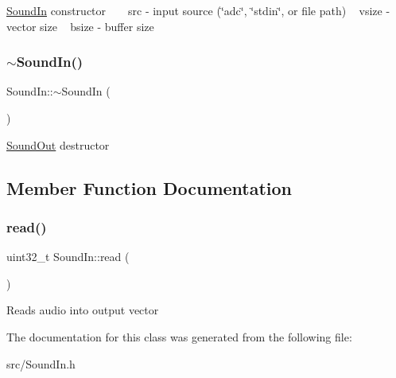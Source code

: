 \hyperlink{class_sound_in}{Sound\+In} constructor ~\newline
~\newline
src -\/ input source (\char`\"{}adc\char`\"{}, \char`\"{}stdin\char`\"{}, or file path) ~\newline
vsize -\/ vector size ~\newline
bsize -\/ buffer size ~\newline
\mbox{\label{class_sound_in_ac72a498714e161d1d691821f1214f2f3}} 
\subsubsection{\texorpdfstring{$\sim$\+Sound\+In()}{~SoundIn()}}
{\footnotesize\ttfamily Sound\+In\+::$\sim$\+Sound\+In (\begin{DoxyParamCaption}{ }\end{DoxyParamCaption})}

\hyperlink{class_sound_out}{Sound\+Out} destructor 

\subsection{Member Function Documentation}
\mbox{\label{class_sound_in_adef1afd60041390537e1f3cef1e5a282}} 
\subsubsection{\texorpdfstring{read()}{read()}}
{\footnotesize\ttfamily uint32\+\_\+t Sound\+In\+::read (\begin{DoxyParamCaption}{ }\end{DoxyParamCaption})}

Reads audio into output vector 

The documentation for this class was generated from the following file\+:\begin{DoxyCompactItemize}
\item 
src/Sound\+In.\+h\end{DoxyCompactItemize}
